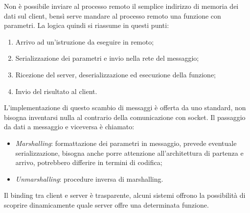 Non è possibile inviare al processo remoto il semplice indirizzo di memoria dei 
dati sul client, bensì serve mandare al processo remoto una funzione con parametri.
La logica quindi si riassume in questi punti:
\begin{enumerate}
    \item Arrivo ad un'istruzione da eseguire in remoto;
    \item Serializzazione dei parametri e invio nella rete del messaggio;
    \item Ricezione del server, deserializzazione ed esecuzione della funzione;
    \item Invio del risultato al client.
\end{enumerate}
L'implementazione di questo scambio di messaggi è offerta da uno standard, 
non bisogna inventarsi nulla al contrario della comunicazione con socket.
Il passaggio da dati a messaggio e viceversa è chiamato:
\begin{itemize}
    \item \emph{Marshalling}: formattazione dei parametri in messaggio, prevede
    eventuale serializzazione, bisogna anche porre attenzione all'architettura
    di partenza e arrivo, potrebbero differire in termini di codifica;
    \item \emph{Unmarshalling}: procedure inversa di marshalling.
\end{itemize}
Il binding tra client e server è trasparente, alcuni sistemi offrono la possibilità 
di scoprire dinamicamente quale server offre una determinata funzione.

